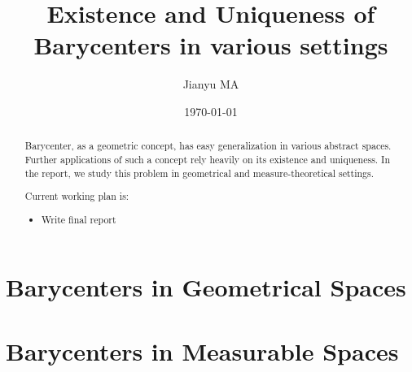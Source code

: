 \documentclass{report}
\title{Existence and Uniqueness of Barycenters in various settings}
\author{Jianyu MA}
\date{\today}
\theoremstyle{remark}
\theoremstyle{definition}
\begin{document}
\maketitle

\begin{abstract}
	Barycenter, as a geometric concept, has easy generalization in various abstract spaces. Further applications of such a concept rely heavily on its existence and uniqueness. In the report, we study this problem in geometrical and measure-theoretical settings.

	Current working plan is:
	\begin{itemize}
		\item Write final report
	\end{itemize}
\end{abstract}

\tableofcontents
{}


\part{Barycenters in Geometrical Spaces}





\part{Barycenters in Measurable Spaces}






\printbibliography
\end{document}
